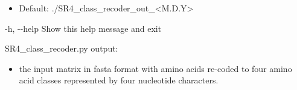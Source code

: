\documentclass{article}
\begin{document}
\begin{description}
\begin{description}
\begin{description}
\begin{itemize}
                        \item Default: ./SR4\_class\_recoder\_out\_<M.D.Y>
                    \end{itemize}
                    \item -h, -\/-help \hspace{0.2cm} Show this help message and exit
                \end{description}
            \end{description}
            \vspace{0.2cm}
            \begin{description}
                \item SR4\_class\_recoder.py output:
                \begin{itemize}
                    \item the input matrix in fasta format with amino acids re-coded to four amino acid classes represented by four nucleotide characters.
                \end{itemize}
            \end{description}
        \end{description}
        
\end{document}
